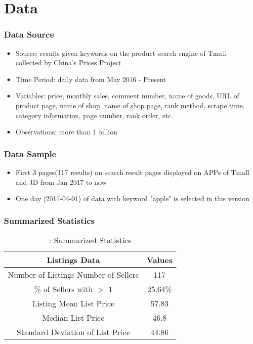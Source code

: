 \documentclass{beamer}
\begin{document}
\section{Data}
\begin{frame}[allowframebreaks]
\frametitle{Data Source}
\begin{itemize}
\item Source: results given keywords on the product search engine of Tmall collected by China's Prices Project\footnotemark
{}
\item Time Period: daily data from May 2016 - Present
\item Variables: price, monthly sales, comment number, name of goods, URL of product page, name of shop, name of shop page, rank method, scrape time, category information, page number, rank order, etc.
\item Observations:  more than 1 billion
\end{itemize}
\end{frame}

\begin{frame}
\frametitle{Data Sample}
\begin{itemize}
  \item First 3 pages(117 results) on search result pages displayed on APPs of Tmall and JD from Jan 2017 to now
  \item One day (2017-04-01) of data with keyword "apple" is selected in this version
\end{itemize}
\end{frame}

\begin{frame}
\frametitle{Summarized Statistics}
\begin{table}[!hbp]
\centering
\begin{tabular}{|c|c|}
\hline
\textbf{Listings Data} & \textbf{Values} \\
\hline 
Number of Listings Number of Sellers & 117 \\
\hline
\% of Sellers with $>$ 1  & 25.64\% \\
\hline
Listing Mean List Price & 57.83  \\
\hline 
Median List Price & 46.8  \\
\hline
Standard Deviation of List Price & 44.86 \\
\hline
\end{tabular}
\caption{\label{summary}: Summarized Statistics}
\end{table}
\end{frame}
\end{document}
